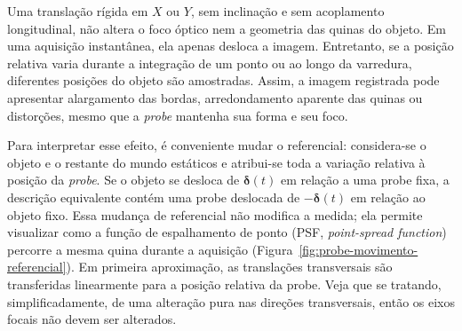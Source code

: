 \documentclass[12pt,a4paper]{article}
\begin{document}
Uma translação rígida em $X$ ou $Y$, sem inclinação e sem acoplamento longitudinal, não altera o foco óptico nem a geometria das quinas do objeto. Em uma aquisição instantânea, ela apenas desloca a imagem. Entretanto, se a posição relativa varia durante a integração de um ponto ou ao longo da varredura, diferentes posições do objeto são amostradas. Assim, a imagem registrada pode apresentar alargamento das bordas, arredondamento aparente das quinas ou distorções, mesmo que a \textit{probe} mantenha sua forma e seu foco.

Para interpretar esse efeito, é conveniente mudar o referencial: considera-se o objeto e o restante do mundo estáticos e atribui-se toda a variação relativa à posição da \textit{probe}. Se o objeto se desloca de $\boldsymbol{\delta}(t)$ em relação a uma probe fixa, a descrição equivalente contém uma probe deslocada de $-\boldsymbol{\delta}(t)$ em relação ao objeto fixo. Essa mudança de referencial não modifica a medida; ela permite visualizar como a função de espalhamento de ponto (PSF, \textit{point-spread function}) percorre a mesma quina durante a aquisição (Figura~\ref{fig:probe-movimento-referencial}). Em primeira aproximação, as translações transversais são transferidas linearmente para a posição relativa da probe. Veja que se tratando, simplificadamente, de uma alteração pura nas direções transversais, então os eixos focais não devem ser alterados.
\end{document}
